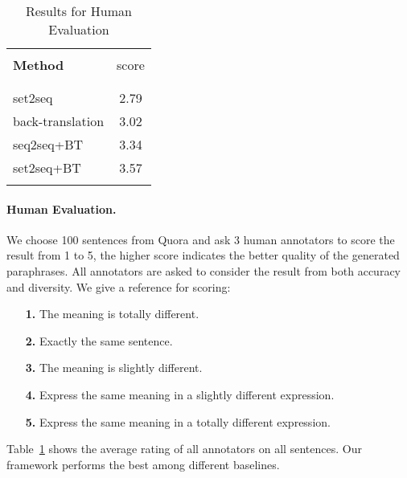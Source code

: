 \begin{table}[th]
\small
\centering
\begin{tabular}{lc}
\hline 
\\ [-1.8ex]
\textbf{Method} & score \\
\\ [-1.8ex]
\hline
\\ [-1.8ex]
set2seq & 2.79 \\
back-translation & 3.02 \\
seq2seq+BT & 3.34 \\
set2seq+BT & 3.57 \\
\\ [-1.8ex]
\hline
\end{tabular}
\caption{\label{tab:human} Results for Human Evaluation}
\end{table}

\paragraph{Human Evaluation.}
We choose 100 sentences from Quora and ask 3 human annotators to score 
the result from 1 to 5, the higher score indicates the better 
quality of the generated paraphrases. All annotators are asked to 
consider the result from both accuracy and diversity. We give a reference for scoring:
\begin{itemize}
\item[\textbf{1.}] The meaning is totally different.
\item[\textbf{2.}] Exactly the same sentence.
\item[\textbf{3.}] The meaning is slightly different.
\item[\textbf{4.}] Express the same meaning in a slightly different expression.
\item[\textbf{5.}] Express the same meaning in a totally different expression.
\end{itemize}
Table~\ref{tab:human} shows the average rating of 
all annotators on all sentences. 
Our framework performs the best among different baselines. 
